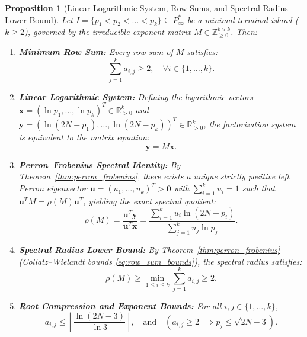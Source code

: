 \documentclass[11pt,a4paper]{article}
\newtheorem{proposition}[theorem]{Proposition}
\theoremstyle{definition}
\begin{document}
\begin{proposition}[Linear Logarithmic System, Row Sums, and Spectral Radius Lower Bound]
\label{prop:spectral_system}
Let $I = \{p_1 < p_2 < \dots < p_k\} \subseteq P^*_\infty$ be a minimal terminal island ($k \ge 2$), governed by the irreducible exponent matrix $M \in \mathbb{Z}_{\ge 0}^{k \times k}$. Then:
\begin{enumerate}
    \item \textbf{Minimum Row Sum:} Every row sum of $M$ satisfies:
    \[
    \sum_{j=1}^k a_{i,j} \ge 2, \quad \forall i \in \{1, \dots, k\}.
    \]
    \item \textbf{Linear Logarithmic System:} Defining the logarithmic vectors $\mathbf{x} = (\ln p_1, \dots, \ln p_k)^T \in \mathbb{R}_{>0}^k$ and $\mathbf{y} = (\ln(2N - p_1), \dots, \ln(2N - p_k))^T \in \mathbb{R}_{>0}^k$, the factorization system is equivalent to the matrix equation:
    \[
    \mathbf{y} = M \mathbf{x}.
    \]
    \item \textbf{Perron--Frobenius Spectral Identity:} By Theorem~\ref{thm:perron_frobenius}, there exists a unique strictly positive left Perron eigenvector $\mathbf{u} = (u_1, \dots, u_k)^T > \mathbf{0}$ with $\sum_{i=1}^k u_i = 1$ such that $\mathbf{u}^T M = \rho(M) \mathbf{u}^T$, yielding the exact spectral quotient:
    \[
    \rho(M) = \frac{\mathbf{u}^T \mathbf{y}}{\mathbf{u}^T \mathbf{x}} = \frac{\sum_{i=1}^k u_i \ln(2N - p_i)}{\sum_{j=1}^k u_j \ln p_j}.
    \]
    \item \textbf{Spectral Radius Lower Bound:} By Theorem~\ref{thm:perron_frobenius} (Collatz--Wielandt bounds \eqref{eq:row_sum_bounds}), the spectral radius satisfies:
    \[
    \rho(M) \ge \min_{1 \le i \le k} \sum_{j=1}^k a_{i,j} \ge 2.
    \]
    \item \textbf{Root Compression and Exponent Bounds:} For all $i, j \in \{1, \dots, k\}$,
    \[
    a_{i,j} \le \left\lfloor \frac{\ln(2N - 3)}{\ln 3} \right\rfloor, \quad \text{and} \quad (a_{i,j} \ge 2 \implies p_j \le \sqrt{2N - 3}).
    \]
\end{enumerate}
\end{proposition}
\end{document}

